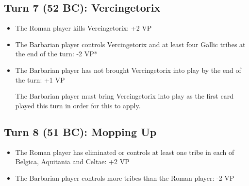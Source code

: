 \subsection{Turn 7 (52 BC): Vercingetorix}
\begin{itemize}
  \setlength\itemsep{0em}
  \item The Roman player kills Vercingetorix: +2 VP
  \item The Barbarian player controls Vercingetorix and at least four Gallic tribes at the end of the turn: -2 VP*
  \item The Barbarian player has not brought Vercingetorix into play by the end of the turn: +1 VP
  
The Barbarian player must bring Vercingetorix into play as the first card played this turn in order for this to apply.
\end{itemize}

\subsection{Turn 8 (51 BC): Mopping Up}
\begin{itemize}
  \setlength\itemsep{0em}
  \item The Roman player has eliminated or controls at least one tribe in each of Belgica, Aquitania and Celtae: +2 VP
  \item The Barbarian player controls more tribes than the Roman player: -2 VP
\end{itemize}
